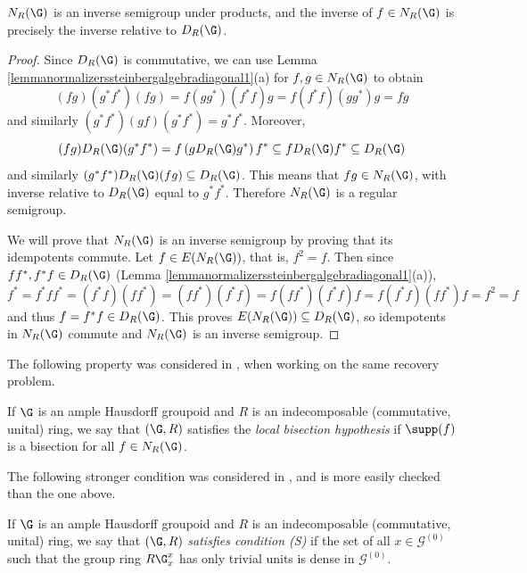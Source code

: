 \begin{proposition}\label{propositionNRGisinversesemigroup}
$N_R(\G)$ is an inverse semigroup under products, and the inverse of $f\in N_R(\G)$ is precisely the inverse relative to $D_R(\G)$.
\end{proposition}
\begin{proof}
Since $D_R(\G)$ is commutative, we can use Lemma \ref{lemmanormalizerssteinbergalgebradiagonal1}(a) for $f,g\in N_R(\G)$ to obtain
\[(fg)(g^*f^*)(fg)=f(gg^*)(f^*f)g=f(f^*f)(gg^*)g=fg\]
and similarly $(g^*f^*)(gf)(g^*f^*)=g^*f^*$. Moreover,
\[(fg)D_R(\G)(g^*f^*)=f\left(gD_R(\G)g^*\right)f^*\subseteq fD_R(\G)f^*\subseteq D_R(\G)\]
and similarly $(g^*f^*)D_R(\G)(fg)\subseteq D_R(\G)$. This means that $fg\in N_R(\G)$, with inverse relative to $D_R(\G)$ equal to $g^*f^*$. Therefore $N_R(\G)$ is a regular semigroup.

We will prove that $N_R(\G)$ is an inverse semigroup by proving that its idempotents commute. Let $f\in E(N_R(\G))$, that is, $f^2=f$. Then since $ff^*,f^*f\in D_R(\G)$ (Lemma \ref{lemmanormalizerssteinbergalgebradiagonal1}(a)),
\[f^*=f^*ff^*=(f^*f)(ff^*)=(ff^*)(f^*f)=f(ff^*)(f^*f)f=f(f^*f)(ff^*)f=f^2=f\]
and thus $f=f^*f\in D_R(\G)$. This proves $E(N_R(\G))\subseteq D_R(\G)$, so idempotents in $N_R(\G)$ commute and $N_R(\G)$ is an inverse semigroup.\qedhere
\end{proof}

The following property was considered in \cite{MR3873946}, when working on the same recovery problem.

\begin{definition}\label{definitionlocalbisectionhypothesis}
If $\G$ is an ample Hausdorff groupoid and $R$ is an indecomposable (commutative, unital) ring, we say that $(\G,R)$ satisfies the \emph{local bisection hypothesis} if $\supp(f)$ is a bisection for all $f\in N_R(\G)$.
\end{definition}

The following stronger condition was considered in \cite{MR3848066}, and is more easily checked than the one above.

\begin{definition}
If $\G$ is an ample Hausdorff groupoid and $R$ is an indecomposable (commutative, unital) ring, we say that $(\G,R)$ \emph{satisfies condition (S)} if the set of all $x\in\mathcal{G}^{(0)}$ such that the group ring $R\G_x^x$ has only trivial units is dense in $\mathcal{G}^{(0)}$.\nocite{MR3743184}
\end{definition}

